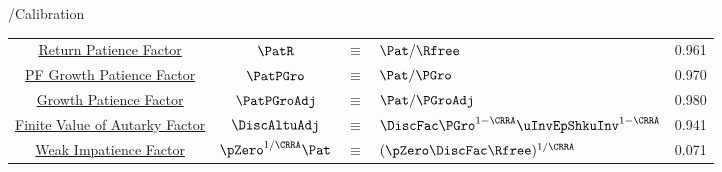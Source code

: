 \documentclass[\econtexRoot/BufferStockTeory]{subfiles}
\let\TableWidth\relax %
\newlength\TableWidth
\begin{document}
\begin{verbatimwrite}{\TableDir/Calibration}
\begin{table}
{\begin{tabular}{|c|ccl|c|}
\href{https://\owner.github.io/BufferStockTheory\#RPF}{Return Patience Factor}                      & $\PatR$ & $\equiv$ & $\Pat/\Rfree $     & 0.961 \\
\href{https://\owner.github.io/BufferStockTheory\#PFGPF}{PF Growth Patience Factor}    & $\PatPGro$ & $\equiv$ & $\Pat/\PGro $      & 0.970 \\
\href{https://\owner.github.io/BufferStockTheory\#GPF}{\phantom{PF~} Growth Patience Factor}                      & $\PatPGroAdj$ & $\equiv$ & $ \Pat/\PGroAdj$& 0.980 \\
\href{https://\owner.github.io/BufferStockTheory\#FVAF}{Finite Value of Autarky Factor}         & $\DiscAltuAdj $ & $\equiv$ & $ \DiscFac \PGro^{1-\CRRA}\uInvEpShkuInv^{1-\CRRA}$       & 0.941 \\ 
\href{https://\owner.github.io/BufferStockTheory\#WRICCond}{Weak Impatience Factor}         & $\pZero^{1/\CRRA} \Pat $ & $\equiv$ & $ (\pZero \DiscFac \Rfree)^{1/\CRRA}$       & 0.071 \\ \hline
\end{tabular}
} %
\settowidth\TableWidth{\usebox{\Calibration}}
\usebox{\Calibration}

\end{table}
\end{verbatimwrite}
\clearpage

\end{document}
